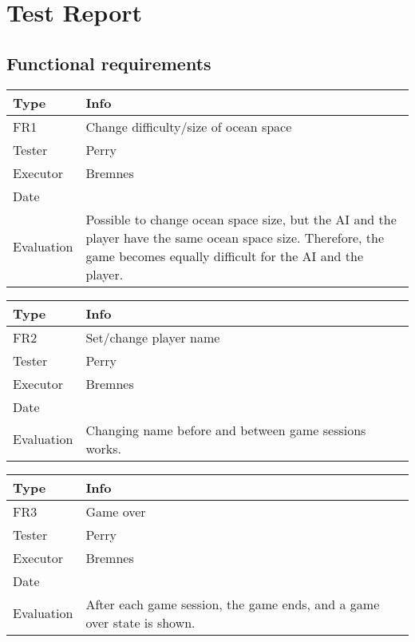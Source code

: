 \chapter{Test Report}



\section{Functional requirements}

\begin{tabular}{|p{2cm}|p{9.5cm}|}
	\hline
	\bf{Type}	& \bf{Info} \\
	\hline
	FR1			& Change difficulty/size of ocean space \\
	Tester		& Perry \\
	Executor	& Bremnes \\
	Date		& \date{\today} \\
	Evaluation	& Possible to change ocean space size, but the AI and the player have the same ocean space size. Therefore, the game becomes equally difficult for the AI and the player.\\
	\hline
\end{tabular}

\vspace{0.5em}

\noindent
\begin{tabular}{|p{2cm}|p{9.5cm}|}
	\hline
	\bf{Type}	& \bf{Info} \\
	\hline
	FR2			& Set/change player name \\
	Tester		& Perry \\
	Executor	& Bremnes \\
	Date		& \date{\today} \\
	Evaluation	& Changing name before and between game sessions works. \\
	\hline
\end{tabular}

\vspace{0.5em}

\noindent
\begin{tabular}{|p{2cm}|p{9.5cm}|}
	\hline
	\bf{Type}	& \bf{Info} \\
	\hline
	FR3			& Game over \\
	Tester		& Perry \\
	Executor	& Bremnes \\
	Date		& \date{\today} \\
	Evaluation	& After each game session, the game ends, and a game over state is shown. \\
	\hline
\end{tabular}

